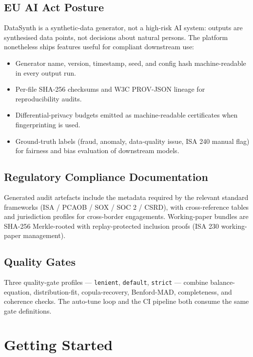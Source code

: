\documentclass[11pt,a4paper]{article}
\begin{document}
\subsection{EU AI Act Posture}

DataSynth is a synthetic-data generator, not a high-risk AI system: outputs
are synthesised data points, not decisions about natural persons. The
platform nonetheless ships features useful for compliant downstream use:

\begin{itemize}[leftmargin=1.2em, itemsep=3pt]
  \item Generator name, version, timestamp, seed, and config hash
        machine-readable in every output run.
  \item Per-file SHA-256 checksums and W3C PROV-JSON lineage for
        reproducibility audits.
  \item Differential-privacy budgets emitted as machine-readable
        certificates when fingerprinting is used.
  \item Ground-truth labels (fraud, anomaly, data-quality issue,
        ISA 240 manual flag) for fairness and bias evaluation of
        downstream models.
\end{itemize}

\subsection{Regulatory Compliance Documentation}

Generated audit artefacts include the metadata required by the relevant
standard frameworks (ISA / PCAOB / SOX / SOC 2 / CSRD), with cross-reference
tables and jurisdiction profiles for cross-border engagements. Working-paper
bundles are SHA-256 Merkle-rooted with replay-protected inclusion proofs
(ISA 230 working-paper management).

\subsection{Quality Gates}

Three quality-gate profiles --- \texttt{lenient}, \texttt{default},
\texttt{strict} --- combine balance-equation, distribution-fit, copula-recovery,
Benford-MAD, completeness, and coherence checks. The auto-tune loop and the
CI pipeline both consume the same gate definitions.

\newpage
\section{Getting Started}
\end{document}
